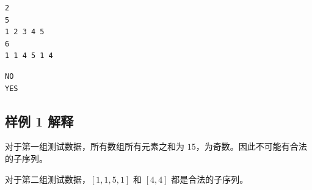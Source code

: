 \begin{minipage}{\linewidth}
\begin{minipage}[t]{0.49\linewidth}
\begin{lstlisting}[title=\texttt{standard input}]
2
5
1 2 3 4 5
6
1 1 4 5 1 4
\end{lstlisting}
\end{minipage}
\begin{minipage}[t]{0.49\linewidth}
\begin{lstlisting}[title=\texttt{standard output}]
NO
YES
\end{lstlisting}
\end{minipage}
\end{minipage}

\subsection{样例 1 解释}

对于第一组测试数据，所有数组所有元素之和为 $15$，为奇数。因此不可能有合法的子序列。

对于第二组测试数据，$[1,1,5,1]$ 和 $[4,4]$ 都是合法的子序列。
